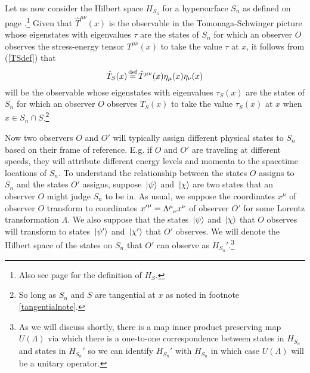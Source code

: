 Let us now consider the Hilbert space $H_{S_n}$  for a hypersurface $S_n$ as defined on page \pageref{HSidef}.\footnote{Also see page \pageref{HSdef} for the definition of $H_S$.} 
Given that $\hat{T}^{\mu\nu}(x)$ is the observable in the Tomonaga-Schwinger picture whose eigenstates with eigenvalues $\tau$ are the states of $S_n$ for which an observer $O$ observes the stress-energy tensor $T^{\mu\nu}(x)$ to take the value $\tau$ at $x$, it follows from (\ref{TSdef}) that 
\begin{equation}\label{TShat}
	\hat{T}_S(x)\myeq \hat{T}^{\mu\nu}(x)\eta_{\mu}(x)\eta_{\nu}(x)
	\end{equation}
will be the observable whose eigenstates with eigenvalues $\tau_S(x)$ are the states of $S_n$ for which an observer $O$ observes $T_S(x)$ to take the value $\tau_S(x)$ at $x$ when $x\in S_n\cap S$.\footnote{So long as $S_n$ and $S$ are tangential at $x$ as noted in footnote \ref{tangentialnote}.}
 
Now two observers $O$ and $O'$ will typically assign different physical states to $S_n$ based on their frame of reference. E.g. if $O$ and $O'$ are traveling at different speeds, they will attribute different energy levels and momenta to the spacetime locations of $S_n$. To understand the relationship between the states $O$ assigns to $S_n$ and the states $O'$ assigns, suppose $\ket*{\psi}$ and  $\ket*{\chi}$ are two states that an observer $O$ might judge $S_n$ to be in. As usual, we suppose the coordinates $x^\mu$ of observer $O$ transform to coordinates ${x'}^\mu=\Lambda\indices{^\mu_\nu}x^\nu$ of observer $O'$ for some Lorentz transformation $\Lambda.$ We also suppose that the states $\ket*{\psi}$ and $\ket*{\chi}$ that $O$ observes will transform to states $\ket*{\psi'}$  and $\ket*{\chi'}$ that $O'$ observes. We will denote the Hilbert space of the states on $S_n$ that $O'$ can observe as $H_{S_n}'$.\label{Hprimespace}\footnote{As we will discuss shortly, there is a map inner product preserving map $U(\Lambda)$ via which there is a one-to-one correspondence between states in $H_{S_n}$ and states in $H_{S_n}'$ so we can identify $H_{S_n}'$ with $H_{S_n}$ in which case $U(\Lambda)$ will be a unitary operator.}

